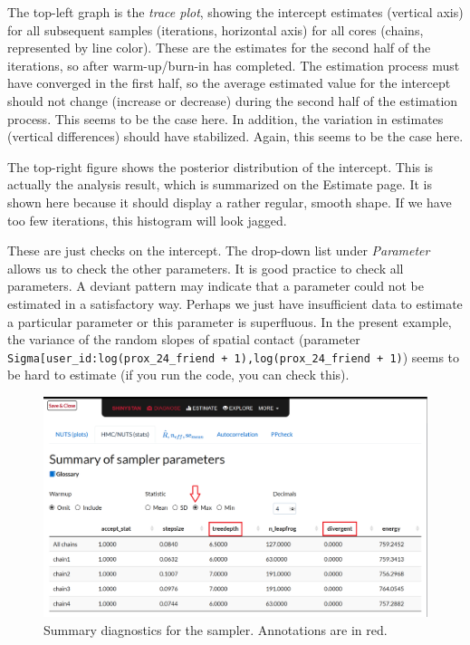\documentclass[doc]{apa6}
\begin{document}
The top-left graph is the \emph{trace plot}, showing the intercept
estimates (vertical axis) for all subsequent samples (iterations,
horizontal axis) for all cores (chains, represented by line color).
These are the estimates for the second half of the iterations, so after
warm-up/burn-in has completed. The estimation process must have
converged in the first half, so the average estimated value for the
intercept should not change (increase or decrease) during the second
half of the estimation process. This seems to be the case here. In
addition, the variation in estimates (vertical differences) should have
stabilized. Again, this seems to be the case here.

The top-right figure shows the posterior distribution of the intercept.
This is actually the analysis result, which is summarized on the
Estimate page. It is shown here because it should display a rather
regular, smooth shape. If we have too few iterations, this histogram
will look jagged.

These are just checks on the intercept. The drop-down list under
\emph{Parameter} allows us to check the other parameters. It is good
practice to check all parameters. A deviant pattern may indicate that a
parameter could not be estimated in a satisfactory way. Perhaps we just
have insufficient data to estimate a particular parameter or this
parameter is superfluous. In the present example, the variance of the
random slopes of spatial contact (parameter
\texttt{Sigma{[}user\_id:log(prox\_24\_friend\ +\ 1),log(prox\_24\_friend\ +\ 1)})
seems to be hard to estimate (if you run the code, you can check this).

\begin{figure}[H]
\includegraphics[width=1\linewidth]{shinystan2} \caption{Summary diagnostics for the sampler. Annotations are in red.}\label{fig:shinystanshot2}
\end{figure}
\end{document}
